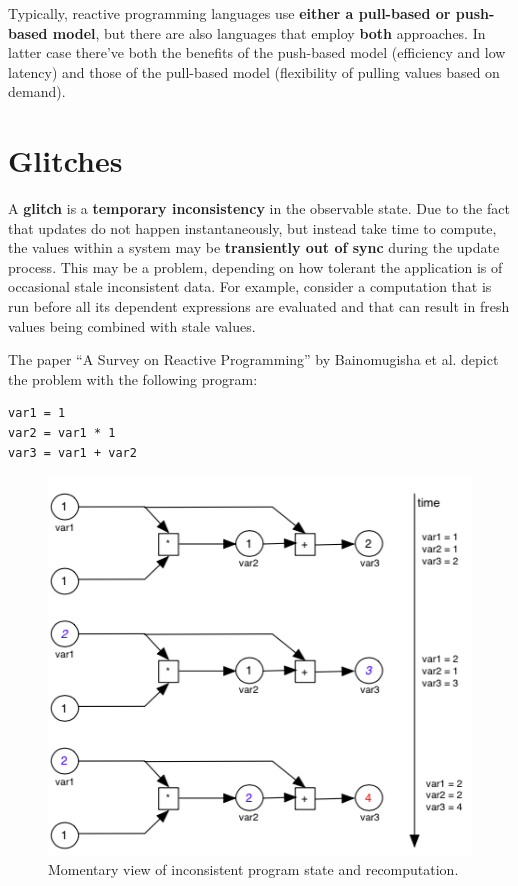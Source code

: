 Typically, reactive programming languages use \textbf{either a
pull-based or push-based model}, but there are also languages that
employ \textbf{both} approaches. In latter case there've both the
benefits of the push-based model (efficiency and low latency) and those
of the pull-based model (flexibility of pulling values based on demand).

\section{Glitches}\label{glitches}

A \textbf{glitch} is a \textbf{temporary inconsistency} in the
observable state. Due to the fact that updates do not happen
instantaneously, but instead take time to compute, the values within a
system may be \textbf{transiently out of sync} during the update
process. This may be a problem, depending on how tolerant the
application is of occasional stale inconsistent data. For example,
consider a computation that is run before all its dependent expressions
are evaluated and that can result in fresh values being combined with
stale values.

The paper ``A Survey on Reactive Programming'' by Bainomugisha et al.
depict the problem with the following program:

\begin{verbatim}
var1 = 1
var2 = var1 * 1
var3 = var1 + var2
\end{verbatim}

\begin{figure}[htbp]
\centering
\includegraphics[scale=0.75]{imgs/glitches.png}
\caption{Momentary view of inconsistent program state and
recomputation.}
\end{figure}

